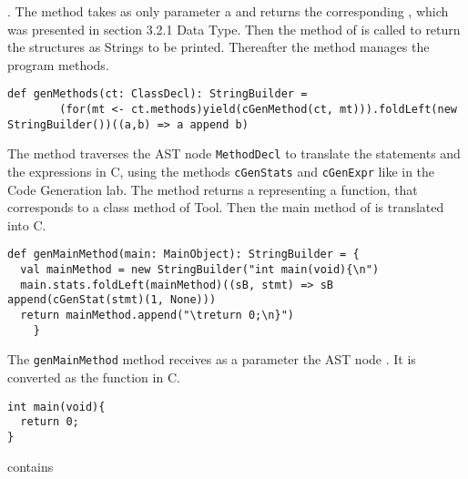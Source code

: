 \newline
\lstset{style=customscala}{\lstinline[basicstyle=\small\ttfamily]|def genStructDef(ct: ClassDecl): StructDef|}.
The method takes as only parameter a \lstset{style=customc}{\lstinline[basicstyle=\small\ttfamily]|ClassDecl|}
and returns the corresponding \lstset{style=customc}{\lstinline[basicstyle=\small\ttfamily]|StructDef|},
which was presented in section 3.2.1 Data Type. Then the method
\lstset{style=customc}{\lstinline[basicstyle=\small\ttfamily]|toStringRepr|} of \lstset{style=customc}{\lstinline[basicstyle=\small\ttfamily]|StructDef|} is called to return the structures as Strings to be printed.
\newline
Thereafter the method manages the program methods.
\lstset{style=customscala}
\begin{lstlisting}
def genMethods(ct: ClassDecl): StringBuilder =
        (for(mt <- ct.methods)yield(cGenMethod(ct, mt))).foldLeft(new StringBuilder())((a,b) => a append b)
\end{lstlisting}
The method \lstset{style=customc}{\lstinline[basicstyle=\small\ttfamily]|cGenMethod|} traverses the AST node\newline
{\lstinline[basicstyle=\small\ttfamily]|MethodDecl|} to translate the statements and the expressions
in C, using the methods {\lstinline[basicstyle=\small\ttfamily]|cGenStats|} and
{\lstinline[basicstyle=\small\ttfamily]|cGenExpr|} like in the Code Generation lab.
The method returns a \lstset{style=customc}{\lstinline[basicstyle=\small\ttfamily]|StringBuilder|}
representing a function, that corresponds to a class method of Tool.
\newline
Then the main method of is translated into C.
\lstset{style=customscala}\begin{lstlisting}
def genMainMethod(main: MainObject): StringBuilder = {
  val mainMethod = new StringBuilder("int main(void){\n")
  main.stats.foldLeft(mainMethod)((sB, stmt) => sB append(cGenStat(stmt)(1, None)))
  return mainMethod.append("\treturn 0;\n}")
    }
\end{lstlisting}
The {\lstinline[basicstyle=\small\ttfamily]|genMainMethod|} method receives
as a parameter the AST node \lstset{style=customc}{\lstinline[basicstyle=\small\ttfamily]|MainObject|}.
It is converted as the \lstset{style=customc}{\lstinline[basicstyle=\small\ttfamily]|main|} function in C.
\begin{lstlisting}
int main(void){
  return 0;
}
\end{lstlisting}
\lstset{style=customc}{\lstinline[basicstyle=\small\ttfamily]|MainObject|} contains
